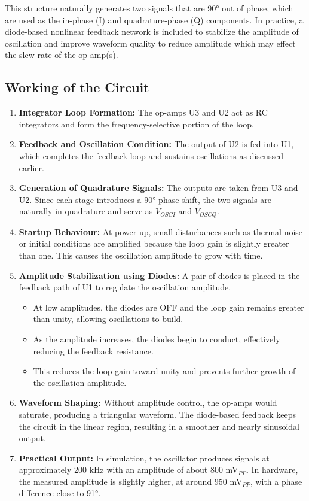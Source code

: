 \documentclass[conference]{IEEEtran}
\begin{document}
This structure naturally generates two signals that are 90° out of phase, which are used as the in-phase (I) and quadrature-phase (Q) components. In practice, a diode-based nonlinear feedback network is included to stabilize the amplitude of oscillation and improve waveform quality to reduce amplitude which may effect the slew rate of the op-amp(s).

\subsection{Working of the Circuit}

\begin{enumerate}

\item \textbf{Integrator Loop Formation:}
The op-amps U3 and U2 act as RC integrators and form the frequency-selective portion of the loop.

\item \textbf{Feedback and Oscillation Condition:}
The output of U2 is fed into U1, which completes the feedback loop and sustains oscillations as discussed earlier.

\item \textbf{Generation of Quadrature Signals:}
The outputs are taken from U3 and U2. Since each stage introduces a 90° phase shift, the two signals are naturally in quadrature and serve as $V_{OSCI}$ and $V_{OSCQ}$.

\item \textbf{Startup Behaviour:}
At power-up, small disturbances such as thermal noise or initial conditions are amplified because the loop gain is slightly greater than one. This causes the oscillation amplitude to grow with time.

\item \textbf{Amplitude Stabilization using Diodes:}
A pair of diodes is placed in the feedback path of U1 to regulate the oscillation amplitude.
\begin{itemize}
\item At low amplitudes, the diodes are OFF and the loop gain remains greater than unity, allowing oscillations to build.
\item As the amplitude increases, the diodes begin to conduct, effectively reducing the feedback resistance.
\item This reduces the loop gain toward unity and prevents further growth of the oscillation amplitude.
\end{itemize}

\item \textbf{Waveform Shaping:}
Without amplitude control, the op-amps would saturate, producing a triangular waveform. The diode-based feedback keeps the circuit in the linear region, resulting in a smoother and nearly sinusoidal output.

\item \textbf{Practical Output:}
In simulation, the oscillator produces signals at approximately 200 kHz with an amplitude of about 800 mV$_{PP}$. In hardware, the measured amplitude is slightly higher, at around 950 mV$_{PP}$, with a phase difference close to 91°.

\end{enumerate}
\end{document}
